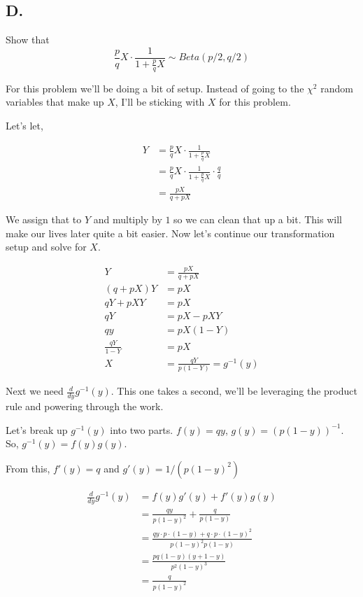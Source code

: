 \subsection*{D.}

Show that 
\[\frac{p}{q}X \cdot \frac{1}{1+\frac{p}{q}X} \sim Beta(p/2, q/2)\]

For this problem we'll be doing a bit of setup. Instead of going to the $\chi^2$ random variables that make up $X$, I'll be sticking with $X$ for this problem.

Let's let,

\vspace{-4mm}
\begin{align*}
	Y &= \frac{p}{q}X \cdot \frac{1}{1+\frac{p}{q}X} \\
	&=  \frac{p}{q}X \cdot \frac{1}{1+\frac{p}{q}X} \cdot \frac{q}{q} \\
	&= \frac{pX}{q+pX}
\end{align*}

We assign that to $Y$ and multiply by $1$ so we can clean that up a bit. This will make our lives later quite a bit easier. Now let's continue our transformation setup and solve for $X$.

\begin{align*}
	Y &= \frac{pX}{q+pX} \\
	(q+pX)Y &= pX \\
	qY + pXY &= pX \\
	qY &= pX - pXY \\
	qy &= pX(1-Y) \\
	\frac{qY}{1-Y} &= pX \\
	X &= \frac{qY}{p(1-Y)} = g^{-1}(y)
\end{align*}

Next we need $\frac{d}{dy} g^{-1}(y)$. This one takes a second, we'll be leveraging the product rule and powering through the work.

Let's break up $g^{-1}(y)$ into two parts. $f(y) = qy$, $g(y) = (p(1-y))^{-1}$. So, $g^{-1}(y) = f(y)g(y)$.

From this, $f'(y) = q$ and $g'(y) = 1/(p(1-y)^2)$

\begin{align*}
	\frac{d}{dy} g^{-1}(y) &= f(y)g'(y) + f'(y)g(y) \\
	&= \frac{qy}{p(1-y)^2} + \frac{q}{p(1-y)} \\
	&= \frac{qy \cdot p \cdot (1-y) + q \cdot p \cdot (1-y)^2}{p(1-y)^2 p(1-y)} \\
	&= \frac{pq(1-y)(y+1-y)}{p^2(1-y)^3} \\
	&= \frac{q}{p(1-y)^2}
\end{align*}


